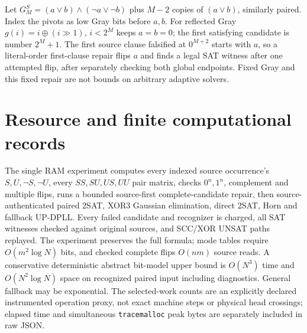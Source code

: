 \documentclass[11pt]{article}
\begin{document}
Let $G_M^S=(a\vee b)\wedge(\neg a\vee\neg b)$ plus
$M-2$ copies of $(a\vee b)$, similarly paired. Index the pivots
as low Gray bits before $a,b$. For reflected Gray
$g(i)=i\oplus(i\gg1)$, $i<2^M$ keeps $a=b=0$;
the first satisfying candidate is number $2^M+1$.
The first source clause falsified at $0^{M+2}$ starts with $a$,
so a literal-order first-clause repair flips $a$ and finds a legal
SAT witness after one attempted flip, after separately checking both
global endpoints. Fixed Gray and this fixed repair are not bounds
on arbitrary adaptive solvers.
\section{Resource and finite computational records}
The single RAM experiment computes every indexed source occurrence's
$S,U,\neg S,\neg U$, every $SS,SU,US,UU$ pair matrix, checks
$0^n,1^n$, complement and multiple flips, runs a bounded
source-first complete-candidate repair, then source-authenticated
paired 2SAT, XOR3 Gaussian elimination, direct 2SAT, Horn and
fallback UP-DPLL. Every failed candidate and recognizer is charged,
all SAT witnesses checked against original sources, and SCC/XOR
UNSAT paths replayed. The experiment preserves the full formula;
mode tables require $O(m^2\log N)$ bits, and checked complete flips
$O(nm)$ source reads. A conservative deterministic abstract bit-model
upper bound is $O(N^3)$ time and $O(N^2\log N)$ space on recognized
paired input including diagnostics. General fallback may be
exponential. The selected-work counts are an explicitly declared
instrumented operation proxy, not exact machine steps or physical
head crossings; elapsed time and simultaneous \texttt{tracemalloc}
peak bytes are separately included in raw JSON.
\end{document}
